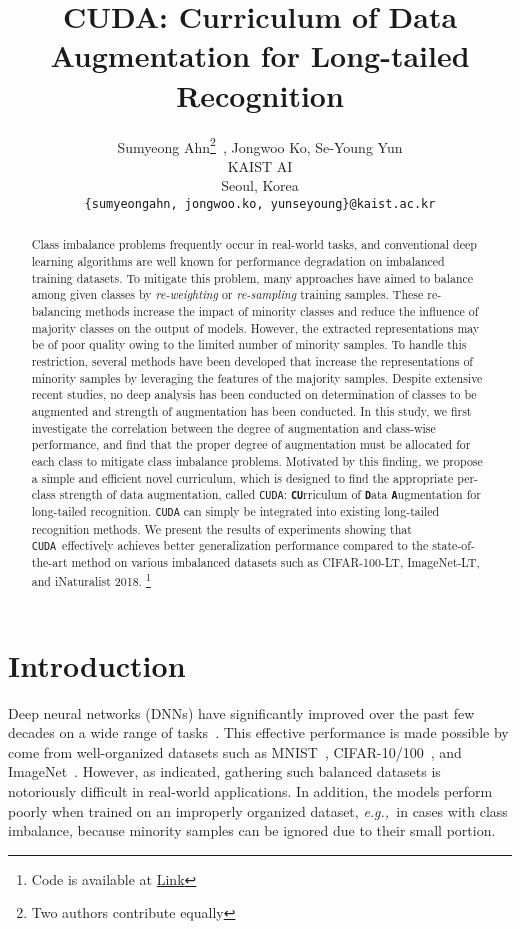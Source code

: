 \documentclass{article}
\title{CUDA: Curriculum of Data Augmentation for Long-tailed Recognition}
\author{Sumyeong Ahn\thanks{Two authors contribute equally}\,\,\,, Jongwoo Ko, Se-Young Yun \\
  KAIST AI \\
  Seoul, Korea \\
  \texttt{\{sumyeongahn, jongwoo.ko,  yunseyoung\}@kaist.ac.kr} \\
}
\newcommand{\eg}{\emph{e.g.,~}}
\def\code#1{\texttt{#1}}
\newcommand{\alg}{\code{CUDA}\xspace}
\renewcommand*\cite[1]{\citep{#1}}
\begin{document}
\maketitle

\begin{abstract}
Class imbalance problems frequently occur in real-world tasks, and conventional deep learning algorithms are well known for performance degradation on imbalanced training datasets. 
To mitigate this problem, many approaches have aimed to balance among given classes by \emph{re-weighting} or \emph{re-sampling} training samples. 
These re-balancing methods increase the impact of minority classes and reduce the influence of majority classes on the output of models. 
However, the extracted representations may be of poor quality owing to the limited number of minority samples.
To handle this restriction, several methods have been developed that increase the representations of minority samples by leveraging the features of the majority samples.  
Despite extensive recent studies, no deep analysis has been conducted on determination of classes to be augmented and strength of augmentation has been conducted.
In this study, we first investigate the correlation between the degree of augmentation and class-wise performance, and find that the proper degree of augmentation must be allocated for each class to mitigate class imbalance problems. Motivated by this finding, we propose a simple and efficient novel curriculum, which is designed to find the appropriate per-class strength of data augmentation, called \alg: \textbf{\code{CU}}rriculum of \textbf{\code{D}}ata \textbf{\code{A}}ugmentation for long-tailed recognition.
\alg can simply be integrated into existing long-tailed recognition methods. We present the results of experiments showing that \alg~effectively achieves better generalization performance compared to the state-of-the-art method on various imbalanced datasets such as CIFAR-100-LT, ImageNet-LT, and iNaturalist 2018.  
\footnote{Code is available at \href{https://github.com/sumyeongahn/CUDA_LTR}{Link}}
\vspace{-10pt}
 \end{abstract}
\section{Introduction}
\label{sec:intro}

Deep neural networks (DNNs) have significantly improved over the past few decades on a wide range of tasks~\cite{he2017mask, redmon2017yolo9000, qi2017pointnet}. This effective performance is made possible by come from well-organized datasets such as MNIST~\cite{lecun1998gradient}, CIFAR-10/100~\cite{krizhevsky2009learning}, and ImageNet~\cite{russakovsky2015imagenet}. However, as \citet{van2018inaturalist} indicated, gathering such balanced datasets is notoriously difficult in real-world applications. In addition, the models perform poorly when trained on an improperly organized dataset, \eg in cases with class imbalance, because minority samples can be ignored due to their small portion.
\end{document}
